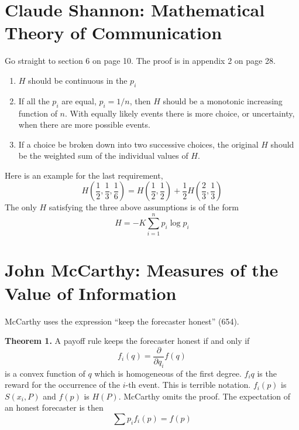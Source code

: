 \documentclass[12pt]{article}
\begin{document}
\section{Claude Shannon: Mathematical Theory of Communication}
\label{section:aehooboo}

Go straight to section 6 on page 10. The proof is in appendix 2 on
page 28.
\begin{enumerate}
\item $H$ should be continuous in the $p_{i}$
\item If all the $p_{i}$ are equal, $p_{i}=1/n$, then $H$ should
  be a monotonic increasing function of $n$. With equally likely
  events there is more choice, or uncertainty, when there are more
  possible events.
\item If a choice be broken down into two successive choices, the
  original $H$ should be the weighted sum of the individual values
  of $H$.
\end{enumerate}
Here is an example for the last requirement,
\begin{equation}
  \label{eq:ohfaexoo}
  H\left(\frac{1}{2},\frac{1}{3},\frac{1}{6}\right)=H\left(\frac{1}{2},\frac{1}{2}\right)+\frac{1}{2}H\left(\frac{2}{3},\frac{1}{3}\right)
\end{equation}
The only $H$ satisfying the three above assumptions is of the form
\begin{equation}
  \label{eq:eogohupi}
  H=-K\sum_{i=1}^{n}p_{i}\log{}p_{i}
\end{equation}

\section{John McCarthy: Measures of the Value of Information}
\label{section:bohfiebe}

McCarthy uses the expression ``keep the forecaster honest'' (654).

\textbf{Theorem 1.} A payoff rule keeps the forecaster honest if and only if
\begin{equation}
  \label{eq:hievaime}
  f_{i}(q)=\frac{\partial}{\partial{}q_{i}}f(q)
\end{equation}
is a convex function of $q$ which is homogeneous of the first degree.
$f_{i}{q}$ is the reward for the occurrence of the $i$-th event. This
is terrible notation. $f_{i}(p)$ is $S(x_{i},P)$ and $f(p)$ is $H(P)$.
McCarthy omits the proof. The expectation of an
honest forecaster is then
\begin{equation}
  \label{eq:kohrupov}
  \sum{}p_{i}f_{i}(p)=f(p)
\end{equation}
\end{document}
